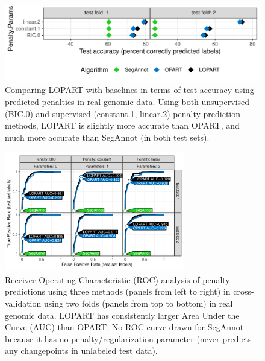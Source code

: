 \documentclass[12pt]{article}
\begin{document}
\begin{figure}
    \centering
    \includegraphics[width=\textwidth]{figure-cv-BIC.pdf}
    \vskip -0.5cm
    \caption{Comparing LOPART with baselines in terms of test accuracy using predicted penalties in real genomic data. Using both unsupervised (BIC.0) and supervised (constant.1, linear.2) penalty prediction methods, LOPART is slightly more accurate than OPART, and much more accurate than SegAnnot (in both test sets).
    }
    \label{fig:cv-BIC}
\end{figure}

\begin{figure}
    \centering
    \includegraphics[width=0.7\textwidth]{figure-cv-BIC-roc.pdf}
    \vskip -0.5cm
    \caption{Receiver Operating Characteristic (ROC) analysis of penalty predictions using three methods (panels from left to right) in cross-validation using two folds (panels from top to bottom) in real genomic data. LOPART has consistently larger Area Under the Curve (AUC) than OPART. No ROC curve drawn for SegAnnot because it has no penalty/regularization parameter (never predicts any changepoints in unlabeled test data).
    }
    \label{fig:cv-BIC-roc}
\end{figure}
\end{document}
